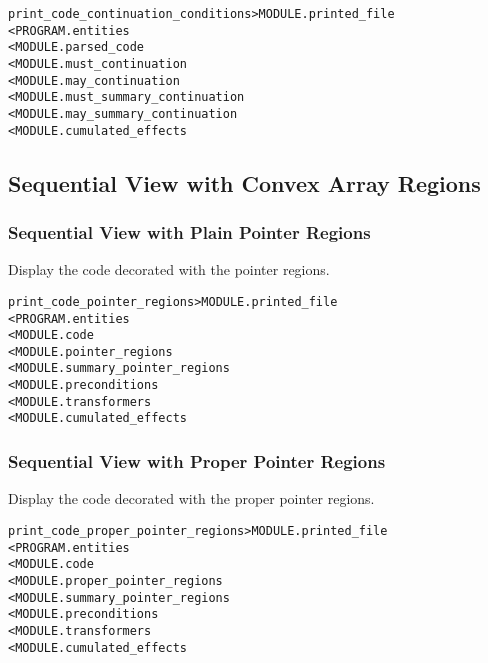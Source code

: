 \documentclass[a4paper]{report}
\newenvironment{PipsMake}{\begin{alltt}}{\end{alltt}}
\newenvironment{PipsPass}[1]{\label{pass:#1}}{}
\begin{document}
\begin{PipsMake}
print_code_continuation_conditions   > MODULE.printed_file
        < PROGRAM.entities
        < MODULE.parsed_code
        < MODULE.must_continuation
        < MODULE.may_continuation
        < MODULE.must_summary_continuation
        < MODULE.may_summary_continuation
        < MODULE.cumulated_effects
\end{PipsMake}


\subsection{Sequential View with Convex Array Regions}

\subsubsection{Sequential View with Plain Pointer Regions}
\label{sec:plain-pointer-regions}

\begin{PipsPass}{print_code_pointer_regions}
Display the code decorated with the pointer regions.
\end{PipsPass}

\begin{PipsMake}
print_code_pointer_regions              > MODULE.printed_file
        < PROGRAM.entities
        < MODULE.code
        < MODULE.pointer_regions
        < MODULE.summary_pointer_regions
        < MODULE.preconditions
        < MODULE.transformers
        < MODULE.cumulated_effects
\end{PipsMake}

\subsubsection{Sequential View with Proper Pointer Regions}

\begin{PipsPass}{print_code_proper_pointer_regions}
Display the code decorated with the proper pointer regions.
\end{PipsPass}

\begin{PipsMake}
print_code_proper_pointer_regions          > MODULE.printed_file
        < PROGRAM.entities
        < MODULE.code
        < MODULE.proper_pointer_regions
        < MODULE.summary_pointer_regions
        < MODULE.preconditions
        < MODULE.transformers
        < MODULE.cumulated_effects
\end{PipsMake}
\end{document}
